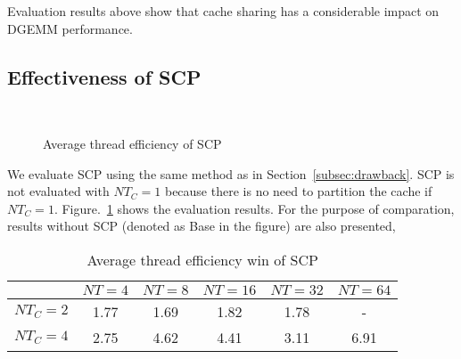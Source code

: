 Evaluation results above show that cache sharing has a considerable
impact on DGEMM performance. 

\subsection{Effectiveness of SCP}\label{subsec:benefit}

\begin{figure}
  \centering
  \\
  \caption{Average thread efficiency of SCP}
  \label{fig:benefit}
\end{figure}

We evaluate SCP using the same method as in Section~\ref{subsec:drawback}.
SCP is not evaluated with $NT_C=1$ because there is no need
to partition the cache if $NT_C=1$.
Figure.~\ref{fig:benefit} shows the evaluation results.
For the purpose of comparation, results without SCP
(denoted as Base in the figure) are also presented,

\begin{table}
  \centering
  \caption{Average thread efficiency win of SCP}
  \label{tab:win}
  \setlength{\tabcolsep}{3.5pt}
  \begin{tabular}{cccccc}
    \toprule
     & $NT=4$ & $NT=8$ & $NT=16$ & $NT=32$ & $NT=64$ \\
    \midrule
    $NT_C=2$ & 1.77 & 1.69 & 1.82 & 1.78 & - \\
    $NT_C=4$ & 2.75 & 4.62 & 4.41 & 3.11 & 6.91 \\
    \bottomrule
  \end{tabular}
\end{table}


